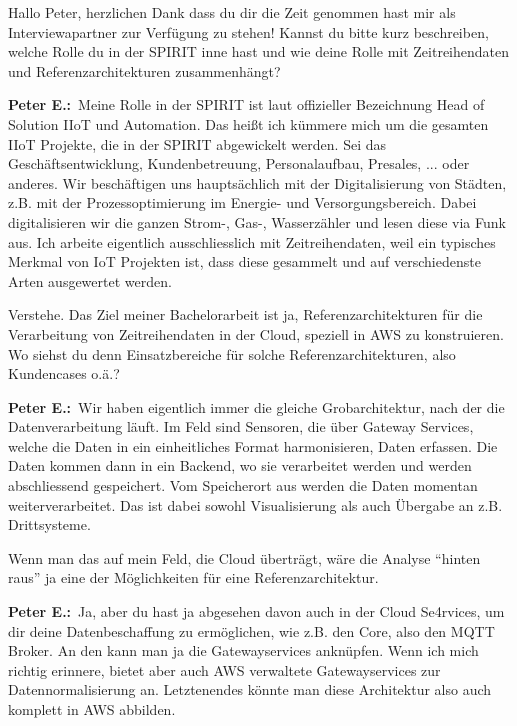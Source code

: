 
\newcommand{\PE}{\textbf{Peter E.:}~}

\LF Hallo Peter, herzlichen Dank dass du dir die Zeit genommen hast mir als Interviewapartner zur Verfügung zu stehen! Kannst du bitte kurz beschreiben, welche Rolle du in der SPIRIT inne hast und wie deine Rolle mit Zeitreihendaten und Referenzarchitekturen zusammenhängt?

\PE Meine Rolle in der SPIRIT ist laut offizieller Bezeichnung Head of Solution \ac{IIoT} und Automation. Das heißt ich kümmere mich um die gesamten \ac{IIoT} Projekte, die in der SPIRIT abgewickelt werden. Sei das Geschäftsentwicklung, Kundenbetreuung, Personalaufbau, Presales, ... oder anderes. Wir beschäftigen uns hauptsächlich mit der Digitalisierung von Städten, z.B. mit der Prozessoptimierung im Energie- und Versorgungsbereich. Dabei digitalisieren wir die ganzen Strom-, Gas-, Wasserzähler und lesen diese via Funk aus. Ich arbeite eigentlich ausschliesslich mit Zeitreihendaten, weil ein typisches Merkmal von \ac{IoT} Projekten ist, dass diese gesammelt und auf verschiedenste Arten ausgewertet werden. 

\LF Verstehe. Das Ziel meiner Bachelorarbeit ist ja, Referenzarchitekturen für die Verarbeitung von Zeitreihendaten in der Cloud, speziell in \ac{AWS} zu konstruieren. Wo siehst du denn Einsatzbereiche für solche Referenzarchitekturen, also Kundencases o.ä.? 

\PE Wir haben eigentlich immer die gleiche Grobarchitektur, nach der die Datenverarbeitung läuft. Im Feld sind Sensoren, die über Gateway Services, welche die Daten in ein einheitliches Format harmonisieren, Daten erfassen. Die Daten kommen dann in ein Backend, wo sie verarbeitet werden und werden abschliessend gespeichert. Vom Speicherort aus werden die Daten momentan weiterverarbeitet. Das ist dabei sowohl Visualisierung als auch Übergabe an z.B. Drittsysteme. 

\LF Wenn man das auf mein Feld, die Cloud überträgt, wäre die Analyse \enquote{hinten raus} ja eine der Möglichkeiten für eine Referenzarchitektur.

\PE Ja, aber du hast ja abgesehen davon auch in der Cloud Se4rvices, um dir deine Datenbeschaffung zu ermöglichen, wie z.B. den \AWSIOT Core, also den \ac{MQTT} Broker. An den kann man ja die Gatewayservices anknüpfen. Wenn ich mich richtig erinnere, bietet aber auch \ac{AWS} verwaltete Gatewayservices zur Datennormalisierung an. Letztenendes könnte man diese Architektur also auch komplett in \ac{AWS} abbilden.

